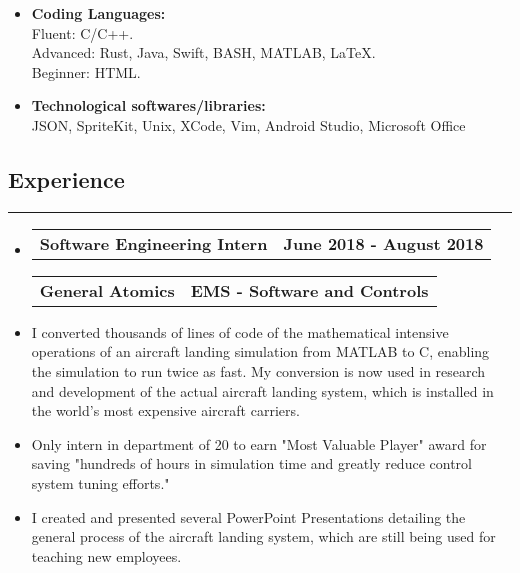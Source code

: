 \documentclass[10pt,letterpaper]{article}
\makeatletter
\newcommand{\header}[2]
{
	\begin{tabular*}{\linewidth}{l@{\extracolsep{\fill}}r}
		#1 &
		#2 \\
	\end{tabular*}
}
\newcommand{\sectionbreak}
{
	\vspace{-1.2em}
	\rule{\textwidth}{1.7pt}
	\vspace{-1.7em}
}
\makeatother
\begin{document}
\begin{itemize}
	\item
		\textbf{Coding Languages:}  \\
		\hspace*{2.25em} Fluent: C/C++. \\
		\hspace*{2.25em} Advanced: Rust, Java, Swift, BASH, MATLAB, \LaTeX. \\
		\hspace*{2.25em} Beginner: HTML.
		\vspace{-0.75em}
	\item
		\textbf{Technological softwares/libraries:} \\
		\hspace*{2.25em} JSON, SpriteKit, Unix, XCode, Vim, Android Studio, Microsoft Office  
		\vspace{-0.25em}
		
\end{itemize}

\vspace{-1.75em}

\subsection*{Experience}
\sectionbreak

\begin{itemize}
	\item[]
		\header
			{\textbf{Software Engineering Intern}} 
			{\textbf{June 2018 - August 2018}}
		\header
		{\textbf{General Atomics}}
		{\textbf{EMS - Software and Controls}} 
		\item
			I converted thousands of lines of code of the mathematical intensive operations of an aircraft landing simulation from MATLAB to C, enabling the simulation to run twice as fast. My conversion is now used in research and development of the actual aircraft landing system, which is installed in the world’s most expensive aircraft carriers.
		\item
			Only intern in department of 20 to earn "Most Valuable Player" award for saving "hundreds of hours in simulation time and greatly reduce control system tuning efforts."
		\item
			I created and presented several PowerPoint Presentations detailing the general process of the aircraft landing system, which are still being used for teaching new employees.


\end{itemize}
\end{document}

